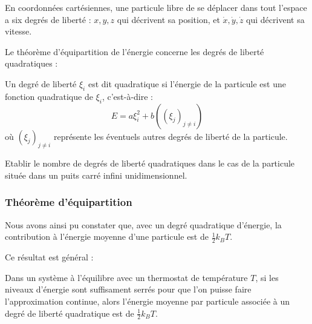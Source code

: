 \documentclass[11pt,fleqn]{book} %
\begin{document}
\begin{example}
	En coordonnées cartésiennes, une particule libre de se déplacer dans tout l'espace a six degrés de liberté : $x,y,z$ qui décrivent sa position, et $\dot x,\dot y, \dot z$ qui décrivent sa vitesse.
\end{example}

Le théorème d'équipartition de l'énergie concerne les degrés de liberté quadratiques :
\begin{definition}
	Un degré de liberté $\xi_i$ est dit quadratique si l'énergie de la particule est une fonction quadratique de $\xi_i$, c'est-à-dire :
	\begin{equation}
		E = a  \xi_i^2 + b((\xi_j)_{j \neq i})
	\end{equation}
	où $(\xi_j)_{j \neq i}$ représente les éventuels autres degrés de liberté de la particule.
\end{definition}

\begin{capex}
	Etablir le nombre de degrés de liberté quadratiques dans le cas de la particule située dans un puits carré infini unidimensionnel.
\end{capex}

\subsubsection{Théorème d'équipartition}

Nous avons ainsi pu constater que, avec un degré quadratique d'énergie, la contribution à l'énergie moyenne d'une particule est de $\frac{1}{2} k_B T$. 

Ce résultat est général :

\begin{theorem}
	Dans un système à l'équilibre avec un thermostat de température $T$, si les niveaux d'énergie sont suffisament serrés pour que l'on puisse faire l'approximation continue, alors l'énergie moyenne par particule associée à un degré de liberté quadratique est de $\frac{1}{2} k_B T$.
\end{theorem}
\end{document}
